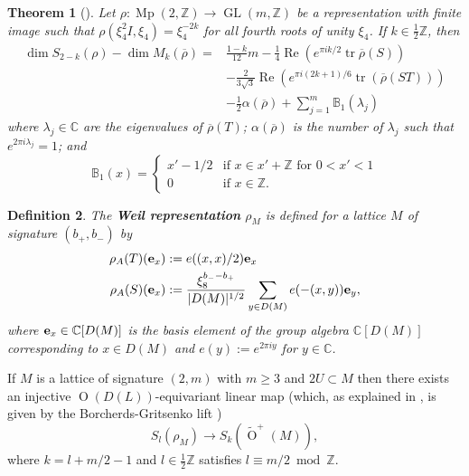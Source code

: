 \documentclass[12pt, a4paper]{article}
\newtheorem{thm}{Theorem}[section]
\newtheorem{defn}[thm]{Definition}
\newcommand{\BB}{\mathbb{B}}
\newcommand{\CC}{\mathbb{C}}
\newcommand{\ZZ}{\mathbb{Z}}
\newcommand{\opn}{\operatorname}
\begin{document}
\begin{thm}[{\hspace{1sp}\cite{SkoruppaThesis}\cite[p.23]{EholzerSkoruppa}}]\label{vvdimform}
  Let $\rho:\opn{Mp}(2, \ZZ) \rightarrow \opn{GL}(m, \ZZ)$ be a representation with finite image such that $\rho(\xi_4^2 I, \xi_4) = \xi_4^{-2k}$ for all fourth roots of unity $\xi_4$.
  If $k \in \frac{1}{2}\ZZ$, then 
  \begin{align}\label{vvdim}
  \opn{dim} S_{2-k}(\rho) - \opn{dim} M_k(\overline{\rho})  =
  &
  \frac{1-k}{12} m - \frac{1}{4} \opn{Re}(e^{\pi i k/2} \opn{tr} \overline{\rho}(S))  \\
   & - \frac{2}{3 \sqrt{3}} \opn{Re}(e^{\pi i (2k+1)/6} \opn{tr}(\overline{\rho}(ST))) \nonumber \\
      & - \frac{1}{2} \alpha(\overline{\rho}) + \sum_{j=1}^m \BB_1(\lambda_j) \nonumber
\end{align}
  where $\lambda_j \in \CC$ are the eigenvalues of $\overline{\rho}(T)$;
  $\alpha(\overline{\rho})$ is the number of $\lambda_j$ such that $e^{2 \pi i \lambda_j} =1$; and 
\[
\BB_1(x) =
\begin{cases}
  x' - 1/2 & \text{if $x \in x' + \ZZ$ for $0<x'<1$} \\
  0 & \text{if $x \in \ZZ$.}
  \end{cases}
\]
\end{thm}
\begin{defn}
The \textbf{Weil representation} $\rho_M$ is defined for a lattice $M$  of signature $(b_+, b_-)$ by
\begin{align}
  \rho_A(T)(\bold{e}_x) & := e((x,x)/2)\bold{e}_x \label{WeilTdef}\\
  \rho_A(S)(\bold{e}_x) & := \frac{\xi_8^{b_- - b_+}}{\vert D(M) \vert^{1/2}} \sum_{y \in D(M)} e(-(x,y)) \bold{e}_y, \label{WeilSdef}
\end{align}
where $\bold{e}_x \in \CC[D(M)]$ is the basis element of the group algebra $\CC[D(M)]$ corresponding to $x \in D(M)$ and $e(y):=e^{2 \pi i y}$ for $y \in \CC$.
\end{defn}
If $M$ is a lattice of signature $(2,m)$ with $m \geq 3$ and $2U \subset M$ then there exists an injective $\opn{O}(D(L))$-equivariant linear map (which,  as explained in \cite{Ma}, is given by the Borcherds-Gritsenko lift \cite{GritsenkoAbelianK3, autograss}) 
\begin{equation}\label{cusplift}
S_l(\rho_M) \rightarrow S_k(\widetilde{\opn{O}}^+(M)),
\end{equation}
where $k = l + m/2 - 1$ and $l \in \frac{1}{2} \ZZ$ satisfies $l \equiv m/2 \bmod{ \ZZ}$.
\end{document}
